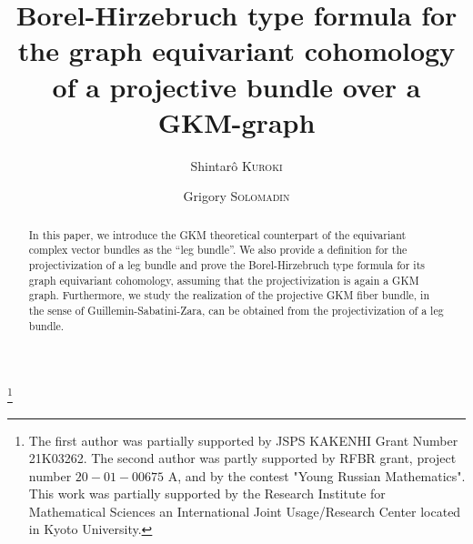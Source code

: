 \documentclass[12pt]{amsart}
\theoremstyle{definition}
\theoremstyle{remark}
\numberwithin{equation}{section}
\begin{document}
\title[Borel-Hirzebruch type formula for GKM graph]{Borel-Hirzebruch type formula for the graph equivariant cohomology of a projective bundle over a GKM-graph}

\author[S.\ Kuroki]{Shintar\^o \textsc{Kuroki}}
\address{Department of Applied Mathematics \\
 Faculty of Science, Okayama University of Science \\
1-1 Ridai-Cho Kita-Ku Okayama-shi \\
Okayama 700-0005, Okayama, Japan}

\author[G.\ Solomadin]{Grigory \textsc{Solomadin}}
\address{
IRMA \\
University of Strasbourg, France}




\thanks{The first author was partially supported by JSPS KAKENHI Grant Number 21K03262. The second author was partly supported by RFBR grant, project number $20-01-00675$ A, and by the contest "Young Russian Mathematics".
This work was partially supported by the Research Institute for Mathematical Sciences an International Joint Usage/Research Center located in Kyoto University. }%

\begin{abstract}
In this paper, we introduce the GKM theoretical counterpart of the equivariant complex vector bundles as the ``leg bundle''.
We also provide a definition for the projectivization of a leg bundle and prove
the Borel-Hirzebruch type formula for its graph equivariant cohomology, assuming that
the projectivization is again a GKM graph.
Furthermore, we study the realization of the projective GKM fiber bundle, in the sense of Guillemin-Sabatini-Zara, can be obtained from the projectivization of a leg bundle.
\end{abstract}

\maketitle
\end{document}
